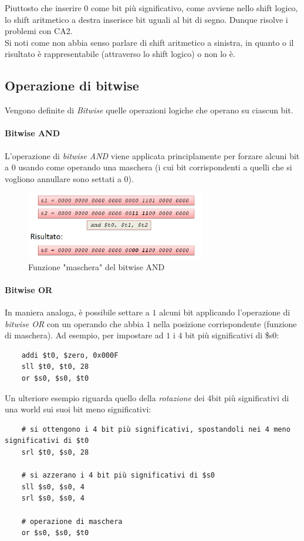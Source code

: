 \documentclass[class=book, crop=false]{standalone}
\begin{document}
Piuttosto che inserire 0 come bit più significativo, come avviene nello shift logico, lo shift aritmetico a destra inserisce bit uguali al bit di segno. Dunque risolve i problemi con CA2.\\
Si noti come non abbia senso parlare di shift aritmetico a sinistra, in quanto o il risultato è rappresentabile (attraverso lo shift logico) o non lo è.

\subsection{Operazione di bitwise}
Vengono definite di \emph{Bitwise} quelle operazioni logiche che operano su ciascun bit.

\paragraph{Bitwise AND}
L'operazione di \emph{bitwise AND} viene applicata principlamente per forzare alcuni bit a 0 usando come operando una maschera (i cui bit corrispondenti a quelli che si vogliono annullare sono settati a 0).
\begin{figure}[H]
	\centering
	\includegraphics[width=0.7\textwidth,keepaspectratio]{bitwise_and}
	\caption{Funzione "maschera" del bitwise AND}
\end{figure}

\paragraph{Bitwise OR}
In maniera analoga, è possibile settare a \(1\) alcuni bit applicando l'operazione di \emph{bitwise OR} con un operando che abbia \(1\) nella posizione corrispondente (funzione di maschera). Ad esempio, per impostare ad \(1\) i \(4\) bit più significativi di \$s0:
\begin{verbatim}
	addi $t0, $zero, 0x000F
	sll $t0, $t0, 28
	or $s0, $s0, $t0
\end{verbatim}

Un ulteriore esempio riguarda quello della \emph{rotazione} dei \(4\)bit più significativi di una world sui suoi bit meno significativi:
\begin{verbatim}
	# si ottengono i 4 bit più significativi, spostandoli nei 4 meno significativi di $t0
	srl $t0, $s0, 28

	# si azzerano i 4 bit più significativi di $s0
	sll $s0, $s0, 4
	srl $s0, $s0, 4

	# operazione di maschera
	or $s0, $s0, $t0
\end{verbatim}
\end{document}
